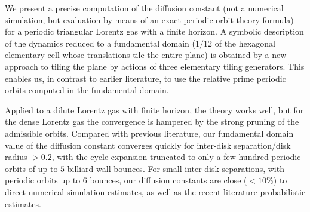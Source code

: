 
We present a precise computation of the diffusion constant (not a numerical
simulation, but evaluation by means of an exact periodic orbit theory formula)
for a periodic triangular Lorentz gas with a finite horizon. A symbolic
description of the dynamics reduced to a fundamental domain ($1/12$ of the
hexagonal elementary cell whose translations tile the entire plane) is obtained
by a new approach to tiling the plane by actions of three elementary tiling
generators. This enables us, in contrast to earlier literature, to use the
relative prime periodic orbits computed in the fundamental domain.

Applied to a dilute Lorentz gas with finite horizon, the theory works well, but
for the dense Lorentz gas the convergence is hampered by the strong pruning of
the admissible orbits.
Compared with previous literature, our fundamental domain value of the
diffusion constant converges quickly for inter-disk separation/disk radius
$>0.2$, with the cycle expansion truncated to only a few hundred periodic
orbits of up to $5$ billiard wall bounces. For small inter-disk separations,
with periodic orbits up to $6$ bounces, our diffusion constants are close
($<10\%$) to direct numerical simulation estimates, as well as the recent
literature probabilistic estimates.
